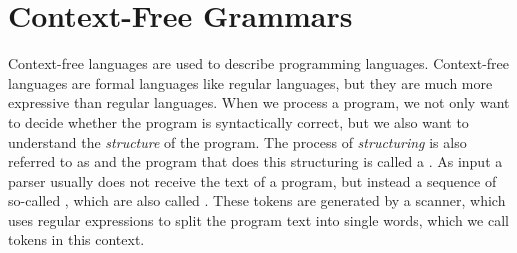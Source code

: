 \section{Context-Free Grammars \label{context-free}}
Context-free languages are used to describe programming languages.
Context-free languages are formal languages like regular languages, but they are much more expressive than
regular languages.
When we process a program, we not only want to
decide whether the program is syntactically correct, but we also want to understand the \emph{structure}
of the program.  The process of \emph{structuring} is also referred to as 
and the program that does this structuring is called a
.  As input a parser usually does not receive the
text of a program, but instead a sequence of so-called , which are also called
.  These tokens are generated by a scanner, which uses regular expressions to split the program text
into single words, which we call tokens in this context.

